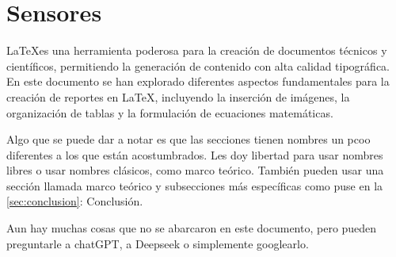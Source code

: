 \section{Sensores}
\LaTeX es una herramienta poderosa para la creación de documentos técnicos y científicos, permitiendo la generación de contenido con alta calidad tipográfica. En este documento se han explorado diferentes aspectos fundamentales para la creación de reportes en \LaTeX, incluyendo la inserción de imágenes, la organización de tablas y la formulación de ecuaciones matemáticas.

Algo que se puede dar a notar es que las secciones tienen nombres un pcoo diferentes a los que están acostumbrados. Les doy libertad para usar nombres libres o usar nombres clásicos, como marco teórico. También pueden usar una sección llamada marco teórico y subsecciones más específicas como puse en la \autoref{sec:conclusion}: Conclusión.

Aun hay muchas cosas que no se abarcaron en este documento, pero pueden preguntarle a chatGPT, a Deepseek o simplemente googlearlo. 
